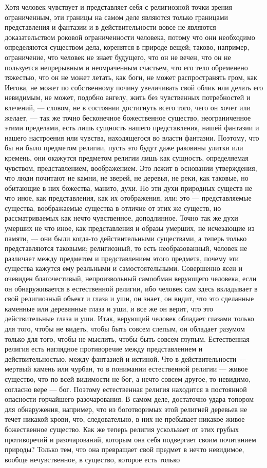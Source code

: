 \documentclass[12pt]{article}
\begin{document}
Хотя человек чувствует и представляет себя с религиозной точки зрения ограниченным, эти границы на самом деле являются только границами представления и фантазии и в действительности вовсе не являются доказательством роковой ограниченности человека, потому что они необходимо определяются существом дела, коренятся в природе вещей; таково, например, ограничение, что человек не знает будущего, что он не вечен, что он не пользуется непрерывным и неомраченным счастьем, что его тело обременено тяжестью, что он не может летать, как боги, не может распространять гром, как Иегова, не может по собственному почину увеличивать свой облик или делать его невидимым, не может, подобно ангелу, жить без чувственных потребностей и влечений, --- словом, не в состоянии достигнуть всего того, чего он хочет или желает, --- так же точно бесконечное божественное существо, неограниченное этими пределами, есть лишь сущность нашего представления, нашей фантазии и нашего настроения или чувства, находящегося во власти фантазии. Поэтому, что бы ни было предметом религии, пусть это будут даже раковины улитки или кремень, они окажутся предметом религии лишь как сущность, определяемая чувством, представлением, воображением. Это лежит в основании утверждения, что люди почитают не камни, не зверей, не деревья, не реки, как таковые, но обитающие в них божества, манито, духи. Но эти духи природных существ не что иное, как представления, как их отображения, или: это --- представляемые существа, воображаемые существа в отличие от этих же существ, но рассматриваемых как нечто чувственное, доподлинное. Точно так же духи умерших не что иное, как представления и образы умерших, не исчезающие из памяти, --- они были когда-то действительными существами, а теперь только представляются таковыми; религиозный, то есть необразованный, человек не различает между предметом и представлением этого предмета, почему эти существа кажутся ему реальными и самостоятельными. Совершенно ясен и очевиден благочестивый, непроизвольный самообман верующего человека, если он обнаруживается в естественной религии, ибо человек сам здесь вкладывает в свой религиозный объект и глаза и уши, он знает, он видит, что это сделанные каменные или деревянные глаза и уши, и все же он верит, что это действительные глаза и уши. Итак, верующий человек обладает глазами только для того, чтобы не видеть, чтобы быть совсем слепым, он обладает разумом только для того, чтобы не мыслить, чтобы быть совсем глупым. Естественная религия есть наглядное противоречие между представлением и действительностью, между фантазией и истиной. Что в действительности --- мертвый камень или чурбан, то в понимании естественной религии --- живое существо, что по всей видимости не бог, а нечто совсем другое, то невидимо, согласно вере --- бог. Поэтому естественная религия находится в постоянной опасности горчайшего разочарования. В самом деле, достаточно удара топором для обнаружения, например, что из боготворимых этой религией деревьев не течет никакой крови, что, следовательно, в них не пребывает никакое живое божественное существо. Как же теперь религия ускользает от этих грубых противоречий и разочарований, которым она себя подвергает своим почитанием природы? Только тем, что она превращает свой предмет в нечто невидимое, вообще нечувственное, в существо, которое есть только 
\end{document}
